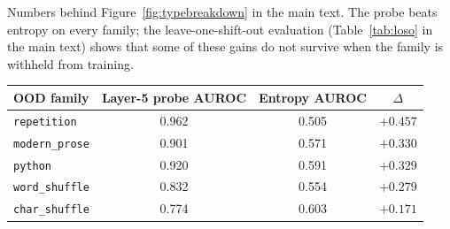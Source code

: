 \documentclass[11pt]{article}
\begin{document}
Numbers behind Figure~\ref{fig:typebreakdown} in the main text. The probe beats entropy on every family; the leave-one-shift-out evaluation (Table~\ref{tab:loso} in the main text) shows that some of these gains do not survive when the family is withheld from training.

\begin{center}
  \small
  \begin{tabular}{lccc}
    \toprule
    OOD family & Layer-5 probe AUROC & Entropy AUROC & $\Delta$ \\
    \midrule
    \texttt{repetition}    & 0.962 & 0.505 & $+0.457$ \\
    \texttt{modern\_prose} & 0.901 & 0.571 & $+0.330$ \\
    \texttt{python}        & 0.920 & 0.591 & $+0.329$ \\
    \texttt{word\_shuffle} & 0.832 & 0.554 & $+0.279$ \\
    \texttt{char\_shuffle} & 0.774 & 0.603 & $+0.171$ \\
    \bottomrule
  \end{tabular}
\end{center}
\end{document}
